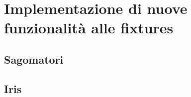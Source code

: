 \documentclass[main.tex]{subfiles}
\begin{document}
\sloppy


\vspace{1.0cm}

\section{Implementazione di nuove funzionalità alle fixtures}\label{sec:NewFeatures}

\subsection{Sagomatori}\label{subsec:5_shaper}

\subsection{Iris}\label{subsec:5_Iris}
\end{document}
